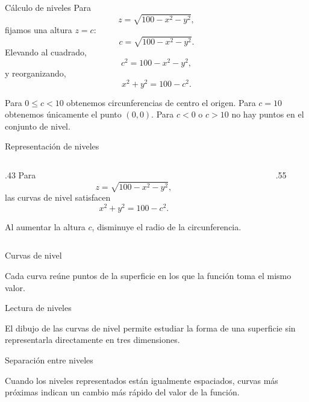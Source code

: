 \begin{frame}{Cálculo de niveles}
\small
Para
\[
z=\sqrt{100-x^2-y^2},
\]
fijamos una altura $z=c$:
\[
c=\sqrt{100-x^2-y^2}.
\]
Elevando al cuadrado,
\[
c^2=100-x^2-y^2,
\]
y reorganizando,
\[
x^2+y^2=100-c^2.
\]
\medskip

Para $0\leq c<10$ obtenemos circunferencias de centro el origen. Para $c=10$ obtenemos únicamente el punto $(0,0)$. Para $c<0$ o $c>10$ no hay puntos en el conjunto de nivel.
\end{frame}

\begin{frame}{Representación de niveles}
\begin{columns}[c]
\begin{column}{.43\textwidth}
Para
\[
z=\sqrt{100-x^2-y^2},
\]
las curvas de nivel satisfacen
\[
x^2+y^2=100-c^2.
\]
\medskip

Al aumentar la altura $c$, disminuye el radio de la circunferencia.
\end{column}
\begin{column}{.55\textwidth}
\end{column}
\end{columns}
\end{frame}

\begin{frame}{Curvas de nivel}
\begin{center}
\small Cada curva reúne puntos de la superficie en los que la función toma el mismo valor.
\end{center}
\end{frame}

\begin{frame}{Lectura de niveles}
\begin{center}
\small El dibujo de las curvas de nivel permite estudiar la forma de una superficie sin representarla directamente en tres dimensiones.
\end{center}
\end{frame}

\begin{frame}{Separación entre niveles}
\begin{center}
\small Cuando los niveles representados están igualmente espaciados, curvas más próximas indican un cambio más rápido del valor de la función.
\end{center}
\end{frame}

